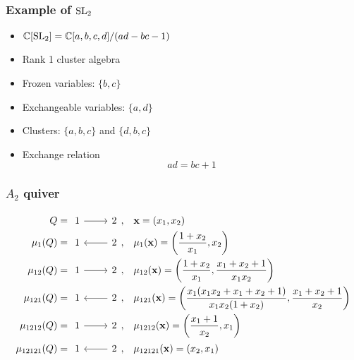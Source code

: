 \documentclass[aspectratio=169]{beamer}
\begin{document}
\begin{frame}
	\frametitle{Example of $\operatorname{SL}_2$}

	\begin{itemize}
		\item $\mathbb{C}[\operatorname{SL}_2] = \mathbb{C}[a,b,c,d] / (ad -bc - 1)$
		\item Rank 1 cluster algebra
		\item Frozen variables: $\{b,c\}$
		\item Exchangeable variables: $\{a,d\}$
		\item Clusters: $\{a,b,c\}$ and $\{d,b,c\}$
		\item Exchange relation
		      \begin{equation*}
			      ad = bc + 1
		      \end{equation*}
	\end{itemize}

\end{frame}
\begin{frame}
	\frametitle{$A_2$ quiver}

	\begin{align*}
		Q = \begin{tikzcd}[ampersand replacement=\&]
			    1 \rar \& 2
		    \end{tikzcd},
		 & \quad \mathbf{x} = \left(x_1, x_2\right)                                                                                  \\
		\mu_1(Q) = \begin{tikzcd}[ampersand replacement=\&]
			           1 \&  \lar 2
		           \end{tikzcd},
		 & \quad \mu_1(\mathbf{x}) = \left(\frac{1+x_2}{x_1}, x_2\right)                                                             \\
		\mu_{12}(Q) = \begin{tikzcd}[ampersand replacement=\&]
			              1 \rar \&  2
		              \end{tikzcd},
		 & \quad  \mu_{12}(\mathbf{x}) = \left(\frac{1+x_2}{x_1}, \frac{x_1 + x_2 + 1}{x_1 x_2}\right)                               \\
		\mu_{121}(Q) = \begin{tikzcd}[ampersand replacement=\&]
			               1 \& \lar 2
		               \end{tikzcd},
		 & \quad  \mu_{121}(\mathbf{x}) = \left(\frac{x_1(x_1 x_2 + x_1 + x_2 + 1)}{x_1x_2(1+x_2)}, \frac{x_1 + x_2 + 1}{x_2}\right) \\
		\mu_{1212}(Q) = \begin{tikzcd}[ampersand replacement=\&]
			                1 \rar\& 2
		                \end{tikzcd},
		 & \quad  \mu_{1212}(\mathbf{x}) = \left(\frac{x_1 + 1}{x_2}, x_1\right)                                                     \\
		\mu_{12121}(Q) = \begin{tikzcd}[ampersand replacement=\&]
			                 1 \& \lar 2
		                 \end{tikzcd},
		 & \quad  \mu_{12121}(\mathbf{x}) = \left(x_2, x_1\right)
	\end{align*}
\end{frame}
\end{document}
